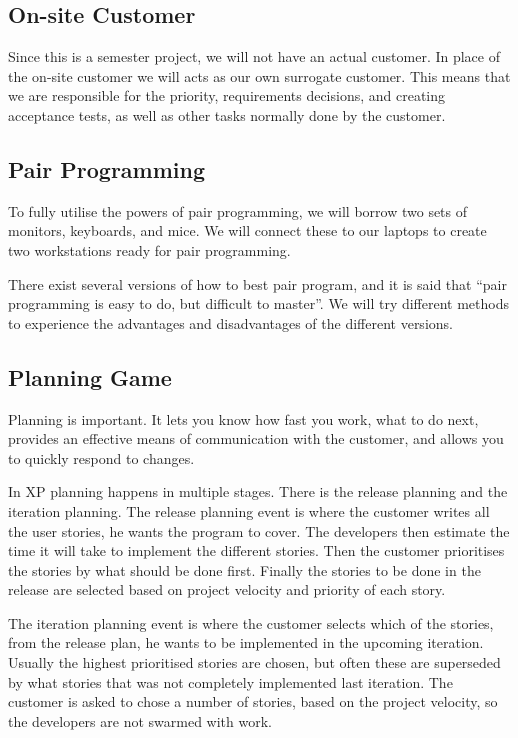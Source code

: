\subsection{On-site Customer}
Since this is a semester project, we will not have an actual customer.
In place of the on-site customer we will acts as our own surrogate customer.
This means that we are responsible for the priority, requirements decisions, and creating acceptance tests, as well as other tasks normally done by the customer.

\subsection{Pair Programming}
To fully utilise the powers of pair programming, we will borrow two sets of monitors, keyboards, and mice.
We will connect these to our laptops to create two workstations ready for pair programming.

There exist several versions of how to best pair program, and it is said that ``pair programming is easy to do, but difficult to master''.
We will try different methods to experience the advantages and disadvantages of the different versions.

\subsection{Planning Game}
Planning is important. It lets you know how fast you work, what to do next,  provides an effective means of communication with the customer, and allows you to quickly respond to changes.

In XP planning happens in multiple stages. There is the release planning and the iteration planning.
The release planning event is where the customer writes all the user stories, he wants the program to cover.
The developers then estimate the time it will take to implement the different stories.
Then the customer prioritises the stories by what should be done first.
Finally the stories to be done in the release are selected based on project velocity and priority of each story.

The iteration planning event is where the customer selects which of the stories, from the release plan, he wants to be implemented in the upcoming iteration.
Usually the highest prioritised stories are chosen, but often these are superseded by what stories that was not completely implemented last iteration.
The customer is asked to chose a number of stories, based on the project velocity, so the developers are not swarmed with work.

